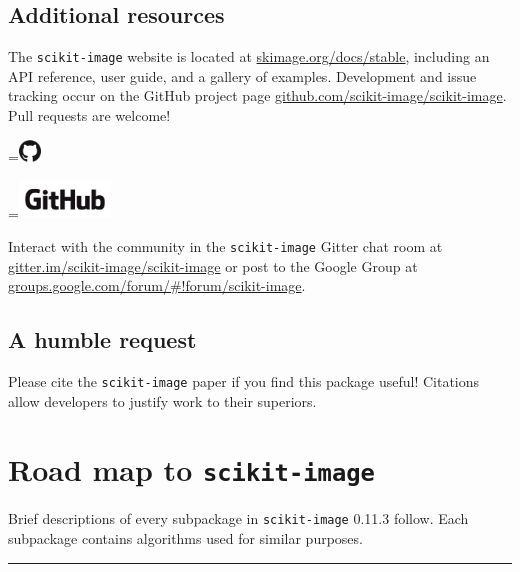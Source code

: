 \documentclass[nohyper, %
               ]{tufte-handout}
\newcommand{\release}{0.11.3\xspace} %
\DeclareRobustCommand{\ski}{\texttt{scikit-image}\xspace}
\newcommand*{\vcenteredhbox}[1]{\begingroup
\setbox0=\hbox{#1}\parbox{\wd0}{\box0}\endgroup}
\begin{document}
\subsection{Additional resources} %
  \label{sub:additional_resources}
  The \ski website is located at \url{skimage.org/docs/stable}, including an API reference, user guide, and a gallery of examples. Development and issue tracking occur on the GitHub project page \url{github.com/scikit-image/scikit-image}. Pull requests are welcome!\\\medskip
  \begin{marginfigure}[-1.7cm]%
    \centering%
    \begingroup
      \vcenteredhbox{\includegraphics[height=0.59cm]{GitHub-Mark-large.png}}%
      \vcenteredhbox{\includegraphics[height=1cm]{GitHub-Logo.png}}%
    \endgroup
    \label{fig:GitHub}%
  \end{marginfigure}%
  \noindent
  Interact with the community in the \ski Gitter chat room at \url{gitter.im/scikit-image/scikit-image} or post to the Google Group at \url{groups.google.com/forum/#!forum/scikit-image}.

\subsection{A humble request} %
  \label{sub:a_humble_request}
  Please cite the \ski paper\cite{van2014scikit} if you find this package useful! Citations allow developers to justify work to their superiors.

\newpage%
\section{Road map to \ski} %
  \label{sec:road_map}
  Brief descriptions of every subpackage in \ski \release follow. Each subpackage contains algorithms used for similar purposes.\\

  \noindent%
  \begingroup%
    \begin{center}%
      \textcolor{DarkGray}{\rule{0.7\textwidth}{.4pt}}\\%
    \end{center}%
  \endgroup%
\end{document}
